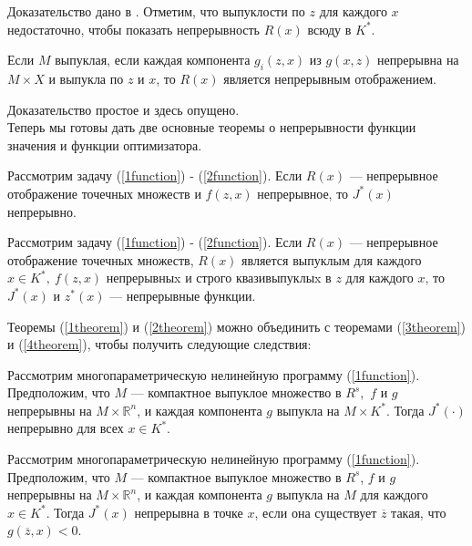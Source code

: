 Доказательство дано в \cite{Hogan}.  Отметим, что выпуклости по $z$ для каждого $x$ недостаточно, чтобы показать непрерывность $R (x)$ всюду в $K^*$.

\begin{theorem}\label{2theorem}
    Если $M$ выпуклая, если каждая компонента $g_{i} (z, x)$ из $g (x, z)$ непрерывна на $M \times X$ и выпукла по $z$ и $x$, то $R (x)$ является непрерывным отображением.
\end{theorem}

Доказательство простое и здесь опущено.\\

Теперь мы готовы дать две основные теоремы о непрерывности функции значения и функции оптимизатора.

\begin{theorem}\label{3theorem}
    Рассмотрим задачу (\ref{1function}) - (\ref{2function}). Если $R (x)$ --- непрерывное отображение точечных множеств и $f (z, x)$ непрерывное, то $J^*(x)$ непрерывно.
\end{theorem}


\begin{theorem}\label{4theorem}
    Рассмотрим задачу (\ref{1function}) - (\ref{2function}). Если $R (x)$ --- непрерывное отображение точечных множеств, $R (x)$ является выпуклым для каждого $x \in K^*,\ f (z, x)$ непрерывныx и строго квазивыпуклыx в $z$ для каждого $x$, то $J^* (x)$ и $z^* (x)$ --- непрерывные функции.
\end{theorem}

Теоремы (\ref{1theorem}) и (\ref{2theorem}) можно объединить с теоремами (\ref{3theorem}) и (\ref{4theorem}), чтобы получить следующие следствия:

\begin{corollary}
    Рассмотрим многопараметрическую нелинейную программу (\ref{1function}). Предположим, что $M$ --- компактное выпуклое множество в $R^{s}$,\ $f$ и $g$ непрерывны на $M \times \mathbb{R}^{n}$, и каждая компонента $g$ выпукла на $M \times K^*$. Тогда $J^* (\cdot)$ непрерывно для всех $x \in K^*$.
\end{corollary}

\begin{corollary}
    Рассмотрим многопараметрическую нелинейную программу (\ref{1function}). Предположим, что $M$ --- компактное выпуклое множество в $R^{s}$, $f$ и $g$ непрерывны на $M \times \mathbb{R}^{n}$, и каждая компонента $g$ выпукла на $M$ для каждого $x \in K^*$. Тогда $J^* (x)$ непрерывна в точке $x$, если она существует $\overline{z}$ такая, что $g (\overline{z}, x) < 0$.
\end{corollary}


